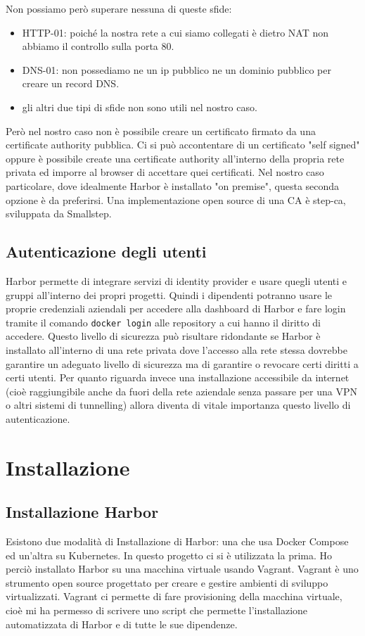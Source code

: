 \documentclass[12pt,a4paper]{report}
\begin{document}
Non possiamo però superare nessuna di queste sfide: 
\begin{itemize}
    \item HTTP-01: poiché la nostra rete a cui siamo collegati è dietro NAT non abbiamo il controllo sulla porta 80.
    \item DNS-01: non possediamo ne un ip pubblico ne un dominio pubblico per creare un record DNS.
    \item gli altri due tipi di sfide non sono utili nel nostro caso.
\end{itemize}
Però nel nostro caso non è possibile creare un certificato firmato da una certificate authority pubblica.
Ci si può accontentare di un certificato "self signed" oppure è possibile create una certificate authority all'interno della propria rete privata ed imporre al browser di accettare quei certificati. Nel nostro caso particolare, dove idealmente Harbor è installato "on premise", questa seconda opzione è da preferirsi. Una implementazione open source di una CA è step-ca, sviluppata da Smallstep.

\section{Autenticazione degli utenti}
Harbor permette di integrare servizi di identity provider e usare quegli utenti e gruppi all'interno dei propri progetti. Quindi i dipendenti potranno usare le proprie credenziali aziendali per accedere alla dashboard di Harbor e fare login tramite il comando \texttt{docker login} alle repository a cui hanno il diritto di accedere.
Questo livello di sicurezza può risultare ridondante se Harbor è installato all'interno di una rete privata dove l'accesso alla rete stessa dovrebbe garantire un adeguato livello di sicurezza ma di garantire o revocare certi diritti a certi utenti. Per quanto riguarda invece una installazione accessibile da internet (cioè raggiungibile anche da fuori della rete aziendale senza passare per una VPN o altri sistemi di tunnelling) allora diventa di vitale importanza questo livello di autenticazione.

\chapter{Installazione}
\section{Installazione Harbor}
Esistono due modalità di Installazione di Harbor: una che usa Docker Compose ed un'altra su Kubernetes. In questo progetto ci si è utilizzata la prima. Ho perciò installato Harbor su una macchina virtuale usando Vagrant. Vagrant è uno strumento open source progettato per creare e gestire ambienti di sviluppo virtualizzati. Vagrant ci permette di fare provisioning della macchina virtuale, cioè mi ha permesso di scrivere uno script che permette l'installazione automatizzata di Harbor e di tutte le sue dipendenze.
\end{document}
